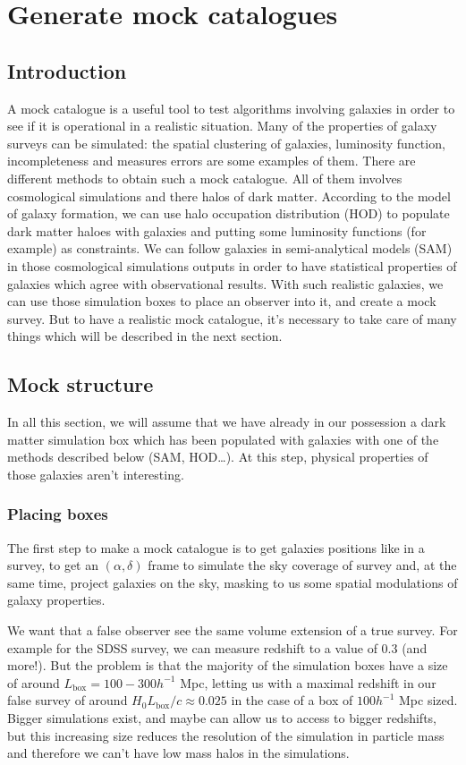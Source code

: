 \chapter{Generate mock catalogues}
\label{cha:mock}
%
\section{Introduction}
%
A mock catalogue is a useful tool to test algorithms involving galaxies in
order to see if it is operational in a realistic situation. Many of the
properties of galaxy surveys can be simulated: the spatial clustering of
galaxies, luminosity function, incompleteness and measures errors are some
examples of them. There are different methods to obtain such a mock catalogue.
All of them involves cosmological simulations and there halos of dark matter.
According to the model of galaxy formation, we can use halo occupation
distribution (HOD) to populate dark matter haloes with galaxies and putting
some luminosity functions (for example) as constraints. We can follow galaxies
in semi-analytical models (SAM) in those cosmological simulations outputs in
order to have statistical properties of galaxies which agree with observational
results. With such realistic galaxies, we can use those simulation boxes to
place an observer into it, and create a mock survey. But to have a realistic
mock catalogue, it's necessary to take care of many things which will be
described in the next section.
%
\section{Mock structure}
%
In all this section, we will assume that we have already in our possession a
dark matter simulation box which has been populated with galaxies with one of
the methods described below (SAM, HOD\ldots). At this step, physical properties
of those galaxies aren't interesting.
%
\subsection{Placing boxes}
%
The first step to make a mock catalogue is to get galaxies positions like in a
survey, to get an $(\alpha,\delta)$ frame to simulate the sky coverage of
survey and, at the same time, project galaxies on the sky, masking to us some
spatial modulations of galaxy properties.

We want that a false observer see the same volume extension of a true survey.
For example for the SDSS survey, we can measure redshift to a value of 0.3 (and
more!). But the problem is that the majority of the simulation boxes have a
size of around $L_{\mathrm{box}}=100-300 h^{-1}$ Mpc, letting us with a maximal
redshift in our false survey of around ${H_0}{L_{\mathrm{box}}}/c\approx 0.025$
in the case of a box of $100 h^{-1}$ Mpc sized. Bigger simulations exist, and
maybe can allow us to access to bigger redshifts, but this increasing size
reduces the resolution of the simulation in particle mass and therefore we
can't have low mass halos in the simulations.

